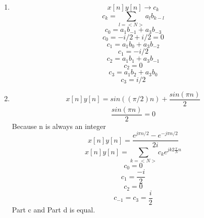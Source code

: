 \documentclass[10pt,a4paper, margin=1in]{article}
\begin{document}
\begin{enumerate}
\begin{enumerate}
    
	\item
    \begin{equation}
        x[n]y[n] \rightarrow c_k
    \end{equation}
    \begin{equation}
        c_k = \sum_{l = <N>} a_lb_{k-l}
    \end{equation}
    \begin{equation}
        c_0 = a_1b_{-1} + a_3b_{-3}
    \end{equation}
    \begin{equation}
        c_0 = -i/2 + i/2 = 0
    \end{equation}
    \begin{equation}
        c_1 = a_1b_{0} + a_3b_{-2}
    \end{equation}
    \begin{equation}
        c_1 = -i/2 
    \end{equation}
        \begin{equation}
        c_2 = a_1b_{1} + a_3b_{-1}
    \end{equation}
    \begin{equation}
        c_2 = 0 
    \end{equation}
        \begin{equation}
        c_3 = a_1b_{2} + a_3b_{0}
    \end{equation}
    \begin{equation}
        c_3 = i/2 
    \end{equation}
	\item %
 \begin{equation}
     x[n]y[n] = sin((\pi/2)n) + \frac{sin(\pi n)}{2}
 \end{equation}
 \begin{equation}
     \frac{sin(\pi n)}{2} = 0
 \end{equation}
 Because n is always an integer
 \begin{equation}
     x[n]y[n] = \frac{e^{j\pi n/2} - e^{-j\pi n/2}}{2i}
 \end{equation}
 \begin{equation}
     x[n]y[n] = \sum_{k=<N>} c_ke^{jk2\frac{\pi}{N}n}
 \end{equation}
 \begin{equation}
     c_0 = 0
 \end{equation}
 \begin{equation}
     c_1 = \frac{-i}{2}
 \end{equation}
 \begin{equation}
     c_2 = 0
 \end{equation}
 \begin{equation}
     c_{-1} = c_3 = \frac{i}{2}
 \end{equation}
 Part c and Part d is equal.
    \end{enumerate}    
    

\end{enumerate}
\end{document}
